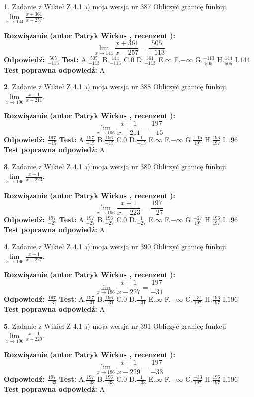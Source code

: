\documentclass[12pt, a4paper]{article}
\theoremstyle{definition} %
\newtheorem{zad}{}
\newcommand{\zadStart}[1]{\begin{zad}#1\newline}
\newcommand{\zadStop}{\end{zad}}
\newcommand{\rozwStart}[2]{\noindent \textbf{Rozwiązanie (autor #1 , recenzent #2): }\newline}
\newcommand{\rozwStop}{\newline}
\newcommand{\odpStart}{\noindent \textbf{Odpowiedź:}\newline}
\newcommand{\odpStop}{\newline}
\newcommand{\testStart}{\noindent \textbf{Test:}\newline}
\newcommand{\testStop}{\newline}
\newcommand{\kluczStart}{\noindent \textbf{Test poprawna odpowiedź:}\newline}
\newcommand{\kluczStop}{\newline}
\begin{document}
\zadStart{Zadanie z Wikieł Z 4.1 a) moja wersja nr 387}
Obliczyć granicę funkcji $\lim\limits_{x\to144}\frac{x+361}{x-257}$.
\zadStop
\rozwStart{Patryk Wirkus}{}
$$\lim\limits_{x\to144}\frac{x+361}{x-257} = \frac{505}{-113}$$
\rozwStop
\odpStart
$\frac{505}{-113}$
\odpStop
\testStart
A.$\frac{505}{-113}$
B.$\frac{144}{-113}$
C.$0$
D.$\frac{361}{-113}$
E.$\infty$
F.$-\infty$
G.$\frac{-113}{505}$
H.$\frac{144}{505}$
I.$144$
\testStop
\kluczStart
A
\kluczStop



\zadStart{Zadanie z Wikieł Z 4.1 a) moja wersja nr 388}
Obliczyć granicę funkcji $\lim\limits_{x\to196}\frac{x+1}{x-211}$.
\zadStop
\rozwStart{Patryk Wirkus}{}
$$\lim\limits_{x\to196}\frac{x+1}{x-211} = \frac{197}{-15}$$
\rozwStop
\odpStart
$\frac{197}{-15}$
\odpStop
\testStart
A.$\frac{197}{-15}$
B.$\frac{196}{-15}$
C.$0$
D.$\frac{1}{-15}$
E.$\infty$
F.$-\infty$
G.$\frac{-15}{197}$
H.$\frac{196}{197}$
I.$196$
\testStop
\kluczStart
A
\kluczStop



\zadStart{Zadanie z Wikieł Z 4.1 a) moja wersja nr 389}
Obliczyć granicę funkcji $\lim\limits_{x\to196}\frac{x+1}{x-223}$.
\zadStop
\rozwStart{Patryk Wirkus}{}
$$\lim\limits_{x\to196}\frac{x+1}{x-223} = \frac{197}{-27}$$
\rozwStop
\odpStart
$\frac{197}{-27}$
\odpStop
\testStart
A.$\frac{197}{-27}$
B.$\frac{196}{-27}$
C.$0$
D.$\frac{1}{-27}$
E.$\infty$
F.$-\infty$
G.$\frac{-27}{197}$
H.$\frac{196}{197}$
I.$196$
\testStop
\kluczStart
A
\kluczStop



\zadStart{Zadanie z Wikieł Z 4.1 a) moja wersja nr 390}
Obliczyć granicę funkcji $\lim\limits_{x\to196}\frac{x+1}{x-227}$.
\zadStop
\rozwStart{Patryk Wirkus}{}
$$\lim\limits_{x\to196}\frac{x+1}{x-227} = \frac{197}{-31}$$
\rozwStop
\odpStart
$\frac{197}{-31}$
\odpStop
\testStart
A.$\frac{197}{-31}$
B.$\frac{196}{-31}$
C.$0$
D.$\frac{1}{-31}$
E.$\infty$
F.$-\infty$
G.$\frac{-31}{197}$
H.$\frac{196}{197}$
I.$196$
\testStop
\kluczStart
A
\kluczStop



\zadStart{Zadanie z Wikieł Z 4.1 a) moja wersja nr 391}
Obliczyć granicę funkcji $\lim\limits_{x\to196}\frac{x+1}{x-229}$.
\zadStop
\rozwStart{Patryk Wirkus}{}
$$\lim\limits_{x\to196}\frac{x+1}{x-229} = \frac{197}{-33}$$
\rozwStop
\odpStart
$\frac{197}{-33}$
\odpStop
\testStart
A.$\frac{197}{-33}$
B.$\frac{196}{-33}$
C.$0$
D.$\frac{1}{-33}$
E.$\infty$
F.$-\infty$
G.$\frac{-33}{197}$
H.$\frac{196}{197}$
I.$196$
\testStop
\kluczStart
A
\kluczStop
\end{document}
